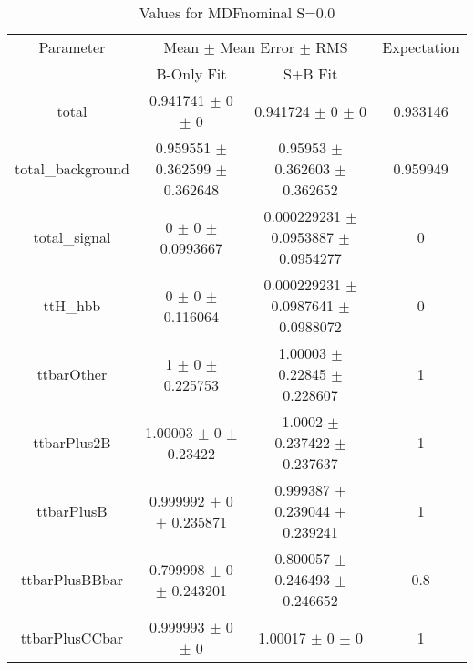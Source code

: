 \begin{table}
\centering
\caption{Values for MDFnominal S=0.0}
\begin{tabular}{cccc}
\toprule
Parameter & \multicolumn{2}{c}{Mean $\pm$ Mean Error $\pm$ RMS} & Expectation\\
 & B-Only Fit & S+B Fit & \\
\midrule
total & \num{0.941741} $\pm$ \num{0} $\pm$ \num{0} & \num{0.941724} $\pm$ \num{0} $\pm$ \num{0} & \num{0.933146}\\
total\_background & \num{0.959551} $\pm$ \num{0.362599} $\pm$ \num{0.362648} & \num{0.95953} $\pm$ \num{0.362603} $\pm$ \num{0.362652} & \num{0.959949}\\
total\_signal & \num{0} $\pm$ \num{0} $\pm$ \num{0.0993667} & \num{0.000229231} $\pm$ \num{0.0953887} $\pm$ \num{0.0954277} & \num{0}\\
ttH\_hbb & \num{0} $\pm$ \num{0} $\pm$ \num{0.116064} & \num{0.000229231} $\pm$ \num{0.0987641} $\pm$ \num{0.0988072} & \num{0}\\
ttbarOther & \num{1} $\pm$ \num{0} $\pm$ \num{0.225753} & \num{1.00003} $\pm$ \num{0.22845} $\pm$ \num{0.228607} & \num{1}\\
ttbarPlus2B & \num{1.00003} $\pm$ \num{0} $\pm$ \num{0.23422} & \num{1.0002} $\pm$ \num{0.237422} $\pm$ \num{0.237637} & \num{1}\\
ttbarPlusB & \num{0.999992} $\pm$ \num{0} $\pm$ \num{0.235871} & \num{0.999387} $\pm$ \num{0.239044} $\pm$ \num{0.239241} & \num{1}\\
ttbarPlusBBbar & \num{0.799998} $\pm$ \num{0} $\pm$ \num{0.243201} & \num{0.800057} $\pm$ \num{0.246493} $\pm$ \num{0.246652} & \num{0.8}\\
ttbarPlusCCbar & \num{0.999993} $\pm$ \num{0} $\pm$ \num{0} & \num{1.00017} $\pm$ \num{0} $\pm$ \num{0} & \num{1}\\
\bottomrule
\end{tabular}
\end{table}
